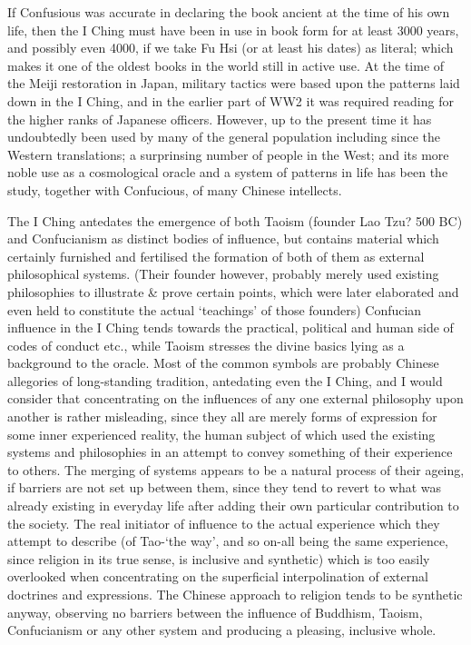 \documentclass[11pt]{book}
\begin{document}
If Confusious was accurate in declaring the book ancient at the time of his own life, then the I Ching must have been in use in book form for at least 3000 years, and possibly even 4000, if we take Fu Hsi (or at least his dates) as literal; which makes it one of the oldest books in the world still in active use. At the time of the Meiji restoration in Japan, military tactics were based upon the patterns laid down in the I Ching, and in the earlier part of WW2 it was required reading for the higher ranks of Japanese officers. However, up to the present time it has undoubtedly been used by many of the general population including since the Western translations; a surprinsing number of people in the West; and its more noble use as a cosmological oracle and a system of patterns in life has been the study, together with Confucious, of many Chinese intellects.

The I Ching antedates the emergence of both Taoism (founder Lao Tzu? 500 BC) and Confucianism as distinct bodies of influence, but contains material which certainly furnished and fertilised the formation of both of them as external philosophical systems. (Their founder however, probably merely used existing philosophies to illustrate \& prove certain points, which were later elaborated and even held to constitute the actual `teachings' of those founders) Confucian influence in the I Ching tends towards the practical, political and human side of codes of conduct etc., while Taoism stresses the divine basics lying as a background to the oracle. Most of the common symbols are probably Chinese allegories of long-standing tradition, antedating even the I Ching, and I would consider that concentrating on the influences of any one external philosophy upon another is rather misleading, since they all are merely forms of expression for some inner experienced reality, the human subject of which used the existing systems and philosophies in an attempt to convey something of their experience to others. The merging of systems appears to be a natural process of their ageing, if barriers are not set up between them, since they tend to revert to what was already existing in everyday life after adding their own particular contribution to the society. The real initiator of influence to the actual experience which they attempt to describe (of Tao-`the way', and so on-all being the same experience, since religion in its true sense, is inclusive and synthetic) which is too easily overlooked when concentrating on the superficial interpolination of external doctrines and expressions. The Chinese approach to religion tends to be synthetic anyway, observing no barriers between the influence of Buddhism, Taoism, Confucianism or any other system and producing a pleasing, inclusive whole.
\end{document}

